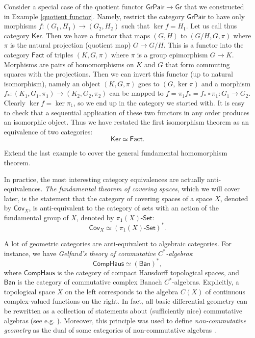 \documentclass[english,letterpaper]{article}%
\numberwithin{equation}{section}
\numberwithin{figure}{section}
\numberwithin{table}{section}
\theoremstyle{definition}
\theoremstyle{definition}
\theoremstyle{definition}
\theoremstyle{plain}
\theoremstyle{plain}
\theoremstyle{plain}
\theoremstyle{plain}
\theoremstyle{remark}
\theoremstyle{remark}
\begin{document}
\begin{example}
Consider a special case of the quotient functor $\mathsf{GrPair}\to\mathsf{Gr}$
that we constructed in Example \ref{quotient functor}. Namely, restrict
the category $\mathsf{GrPair}$ to have only morphisms $f:\left(G_{1},H_{1}\right)\to\left(G_{2},H_{2}\right)$
such that $\ker f=H_{1}$. Let us call thus category $\mathsf{Ker}$.
Then we have a functor that maps $\left(G,H\right)$ to $\left(G/H,G,\pi\right)$
where $\pi$ is the natural projection (quotient map) $G\to G/H$.
This is a functor into the category $\mathsf{Fact}$ of triples $\left(K,G,\pi\right)$
where $\pi$ is a group epimorphism $G\to K$. Morphisms are pairs
of homomorphisms on $K$ and $G$ that form commuting squares with
the projections. Then we can invert this functor (up to natural isomorphism),
namely an object $\left(K,G,\pi\right)$ goes to $\left(G,\ker\pi\right)$
and a morphism $f_{\ast}:\left(K_{1},G_{1},\pi_{1}\right)\to\left(K_{2},G_{2},\pi_{2}\right)$
can be mapped to $f=\pi_{1}f_{\ast}=f_{\ast}\circ\pi_{1}:G_{1}\to G_{2}$.
Clearly $\ker f=\ker\pi_{1}$, so we end up in the category we started
with. It is easy to check that a sequential application of these two
functors in any order produces an isomorphic object. Thus we have
restated the first isomorphism theorem as an equivalence of two categories:
\[
\mathsf{Ker}\simeq\mathsf{Fact}.
\]
\end{example}
\begin{xca}
Extend the last example to cover the general fundamental homomorphism
theorem.
\end{xca}
\begin{example}\label{covering category thm}
In practice, the most interesting category equivalences are actually
anti-equivalences. \emph{The fundamental theorem of covering spaces},
which we will cover later, is the statement that the category of covering
spaces of a space $X$, denoted by $\mathsf{Cov}_{X}$, is anti-equivalent
to the category of sets with an action of the fundamental group of
$X$, denoted by $\pi_{1}\left(X\right)\text{-}\mathsf{Set}$:
\[
\mathsf{Cov}_{X}\simeq\left(\pi_{1}\left(X\right)\text{-}\mathsf{Set}\right)^{\ast}.
\]
\end{example}
%
\begin{example}
A lot of geometric categories are anti-equivalent to algebraic categories.
For instance, we have \emph{Gelfand's theory of commutative $C^{\ast}$-algebras}:
\[
\mathsf{CompHaus}\simeq\left(\mathsf{Ban}\right)^{\ast},
\]
where $\mathsf{CompHaus}$ is the category of compact Hausdorff topological
spaces, and $\mathsf{Ban}$ is the category of commutative complex
Banach $C^{\ast}$-algebras. Explicitly, a topological space $X$
on the left corresponds to the algebra $C\left(X\right)$ of continuous
complex-valued functions on the right. In fact, all basic differential
geometry can be rewritten as a collection of statements about (sufficiently nice)
commutative algebras (see e.g. \cite{JetNest}). Moreover, this principle was used to define \emph{non-commutative geometry} as the dual of some categories of non-commutative algebras \cite{Connes}.
\end{example}
\end{document}
